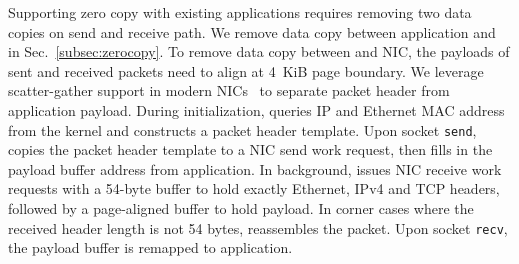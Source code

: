 Supporting zero copy with existing applications requires removing two data copies on send and receive path. We remove data copy between application and \libipc{} in Sec.~\ref{subsec:zerocopy}. To remove data copy between \libipc{} and NIC, the payloads of sent and received packets need to align at 4~KiB page boundary. We leverage scatter-gather support in modern NICs~\cite{mellanox} to separate packet header from application payload. During initialization, \libipc{} queries IP and Ethernet MAC address from the kernel and constructs a packet header template. Upon socket \texttt{send}, \libipc{} copies the packet header template to a NIC send work request, then fills in the payload buffer address from application. In background, \libipc{} issues NIC receive work requests with a 54-byte buffer to hold exactly Ethernet, IPv4 and TCP headers, followed by a page-aligned buffer to hold payload. In corner cases where the received header length is not 54 bytes, \libipc{} reassembles the packet. Upon socket \texttt{recv}, the payload buffer is remapped to application.
